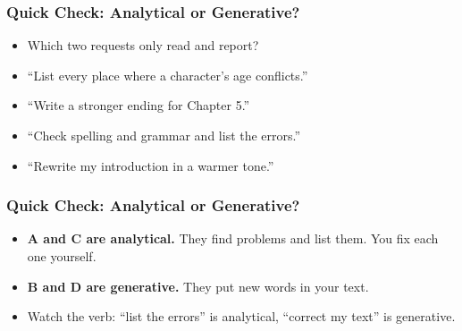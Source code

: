 \begin{frame}[fragile]\frametitle{Quick Check: Analytical or Generative?}
\begin{itemize}
\item Which two requests only read and report?
\item[A.] ``List every place where a character's age conflicts.''
\item[B.] ``Write a stronger ending for Chapter 5.''
\item[C.] ``Check spelling and grammar and list the errors.''
\item[D.] ``Rewrite my introduction in a warmer tone.''
\end{itemize}
\end{frame}

\begin{frame}[fragile]\frametitle{Quick Check: Analytical or Generative?}
\begin{itemize}
\item \textbf{A and C are analytical.} They find problems and list them. You fix each one yourself.
\item \textbf{B and D are generative.} They put new words in your text.
\item Watch the verb: ``list the errors'' is analytical, ``correct my text'' is generative.
\end{itemize}
\end{frame}
